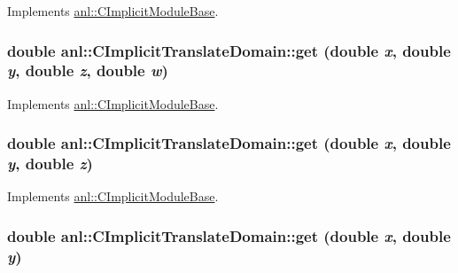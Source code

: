 Implements \hyperlink{classanl_1_1CImplicitModuleBase_aa40b7d54572197612a4fea44b63447eb}{anl::CImplicitModuleBase}.\hypertarget{classanl_1_1CImplicitTranslateDomain_a4c5022a45953ac556e169e2186bf9105}{
\subsubsection[{get}]{\setlength{\rightskip}{0pt plus 5cm}double anl::CImplicitTranslateDomain::get (double {\em x}, \/  double {\em y}, \/  double {\em z}, \/  double {\em w})}}
\label{classanl_1_1CImplicitTranslateDomain_a4c5022a45953ac556e169e2186bf9105}


Implements \hyperlink{classanl_1_1CImplicitModuleBase_a3cf520bdab59631864253c03b4e1723f}{anl::CImplicitModuleBase}.\hypertarget{classanl_1_1CImplicitTranslateDomain_a875f867e25e0d9c5497b68ea5ef8c358}{
\subsubsection[{get}]{\setlength{\rightskip}{0pt plus 5cm}double anl::CImplicitTranslateDomain::get (double {\em x}, \/  double {\em y}, \/  double {\em z})}}
\label{classanl_1_1CImplicitTranslateDomain_a875f867e25e0d9c5497b68ea5ef8c358}


Implements \hyperlink{classanl_1_1CImplicitModuleBase_ac17d592612c82ba3d47f9229a00b1fe3}{anl::CImplicitModuleBase}.\hypertarget{classanl_1_1CImplicitTranslateDomain_a8f0d141a02e5e67245d07ee30324d13d}{
\subsubsection[{get}]{\setlength{\rightskip}{0pt plus 5cm}double anl::CImplicitTranslateDomain::get (double {\em x}, \/  double {\em y})}}
\label{classanl_1_1CImplicitTranslateDomain_a8f0d141a02e5e67245d07ee30324d13d}


